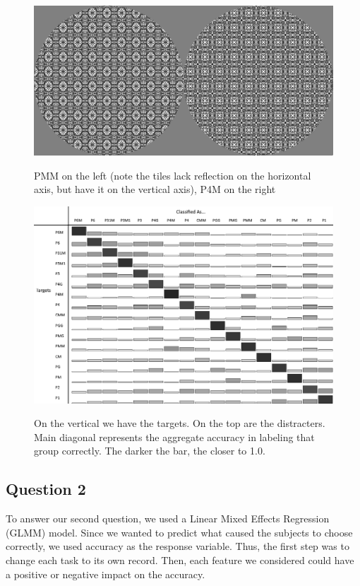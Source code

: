 \begin{figure}[!ht]
\centering
\includegraphics[width=0.9\columnwidth]{pmmp4m}
\label{pmmp4m}
\caption{PMM on the left (note the tiles lack reflection on the horizontal axis, but have it on the vertical axis), P4M on the right}
\end{figure}

\begin{figure}[!ht]
\centering
\includegraphics[width=0.9\columnwidth]{accuracies-grayscale}
\label{fullacc}
\caption{On the vertical we have the targets. On the top are the distracters. Main diagonal represents the aggregate accuracy in labeling that group correctly. The darker the bar, the closer to 1.0.}
\end{figure}

\subsection{Question 2}
To answer our second question, we used a Linear Mixed Effects Regression (GLMM) model. Since we wanted to predict what caused the subjects to choose correctly, we used accuracy as the response variable. Thus, the first step was to change each task to its own record. Then, each feature we considered could have a positive or negative impact on the accuracy.

